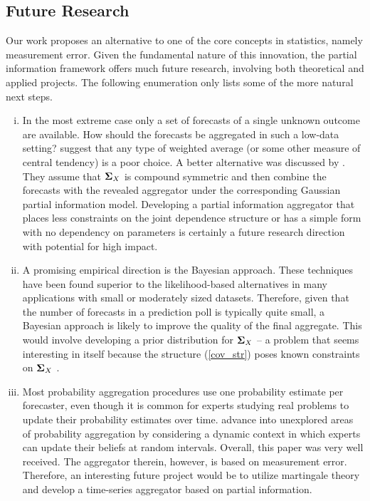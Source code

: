 \documentclass[10pt,twoside]{article}
\theoremstyle{definition}
\theoremstyle{definition}
\def\bSigma{{\bf \Sigma}}
\begin{document}
 \vspace{-1em} \subsection{Future Research}  \vspace{-0.5em}
 Our work proposes an alternative to one of the core concepts in statistics, namely measurement error. 
Given the fundamental nature of this innovation, the partial information framework offers much future research, involving both theoretical and applied projects. The following enumeration only lists some of the more natural next steps. 

\begin{enumerate}[i)]
\item In the most extreme case only a set of forecasts of a single unknown outcome are available. How should the forecasts be aggregated in such a low-data setting? \cite{satopaa2015combining} suggest that any type of weighted average (or some other measure of central tendency) is a poor choice. A better alternative was discussed by \cite{satopaamodeling}. They assume that $\bSigma_X$ is compound symmetric and then combine the forecasts with the revealed aggregator under the corresponding Gaussian partial information model.  Developing a partial information aggregator that places less constraints on the joint dependence structure or has a simple form with no dependency on parameters is certainly a future research direction with potential for high impact. 

\item A promising empirical direction is the Bayesian approach. These techniques have been found superior to the likelihood-based alternatives in many applications with small or moderately sized datasets. Therefore, given that the number of forecasts in a prediction poll is typically quite small, a Bayesian approach is likely to improve the quality of the final aggregate. This would involve  developing a prior distribution for $\bSigma_{X}$ -- a problem that seems interesting in itself because the structure (\ref{cov_str}) poses known constraints on $\bSigma_{X}$ \citep{satopaa2015partial}.  

\item Most probability aggregation procedures use one probability estimate per forecaster, even though it is common for experts studying real problems to update their probability estimates over time. \cite{satopaa2014probability} advance into unexplored areas of probability aggregation by considering a dynamic context in which experts can update their beliefs at random intervals. Overall, this paper was very well received. The aggregator therein, however, is based on measurement error. Therefore, an interesting future project would be to utilize martingale theory and develop a time-series aggregator based on partial information. 


\end{enumerate}
\end{document}
